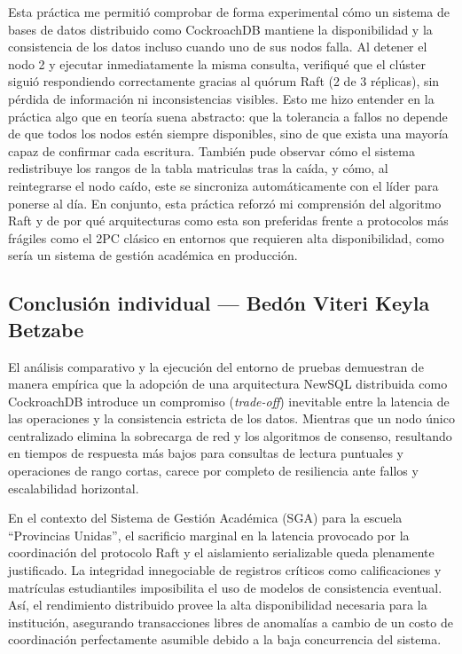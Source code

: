 \documentclass[10pt,a4paper]{article}
\begin{document}
Esta práctica me permitió comprobar de forma experimental cómo un sistema de bases
de datos distribuido como CockroachDB mantiene la disponibilidad y la consistencia
de los datos incluso cuando uno de sus nodos falla. Al detener el nodo 2 y ejecutar
inmediatamente la misma consulta, verifiqué que el clúster siguió respondiendo
correctamente gracias al quórum Raft (2 de 3 réplicas), sin pérdida de información
ni inconsistencias visibles. Esto me hizo entender en la práctica algo que en teoría
suena abstracto: que la tolerancia a fallos no depende de que todos los nodos estén
siempre disponibles, sino de que exista una mayoría capaz de confirmar cada
escritura. También pude observar cómo el sistema redistribuye los rangos de la
tabla matriculas tras la caída, y cómo, al reintegrarse el nodo caído, este se
sincroniza automáticamente con el líder para ponerse al día. En conjunto, esta
práctica reforzó mi comprensión del algoritmo Raft y de por qué arquitecturas como
esta son preferidas frente a protocolos más frágiles como el 2PC clásico en
entornos que requieren alta disponibilidad, como sería un sistema de gestión
académica en producción.

\subsection*{Conclusión individual --- Bedón Viteri Keyla Betzabe}

El análisis comparativo y la ejecución del entorno de pruebas demuestran de manera 
empírica que la adopción de una arquitectura NewSQL distribuida como CockroachDB 
introduce un compromiso (\emph{trade-off}) inevitable entre la latencia de las operaciones 
y la consistencia estricta de los datos. Mientras que un nodo único centralizado elimina 
la sobrecarga de red y los algoritmos de consenso, resultando en tiempos de respuesta más 
bajos para consultas de lectura puntuales y operaciones de rango cortas, carece por completo 
de resiliencia ante fallos y escalabilidad horizontal.

En el contexto del Sistema de Gestión Académica (SGA) para la escuela ``Provincias Unidas'', 
el sacrificio marginal en la latencia provocado por la coordinación del protocolo Raft y 
el aislamiento serializable queda plenamente justificado. La integridad innegociable de registros 
críticos como calificaciones y matrículas estudiantiles imposibilita el uso de modelos de consistencia
eventual. Así, el rendimiento distribuido provee la alta disponibilidad necesaria para la institución, 
asegurando transacciones libres de anomalías a cambio de un costo de coordinación perfectamente asumible 
debido a la baja concurrencia del sistema.
\end{document}
